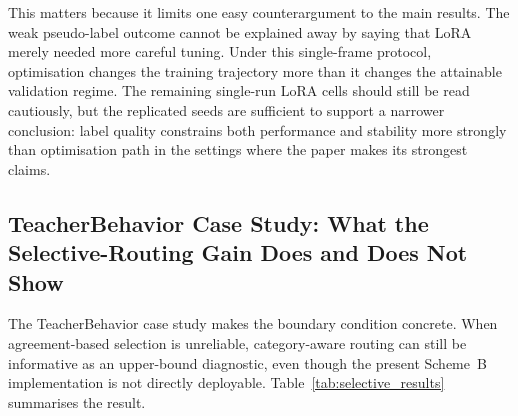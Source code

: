 \documentclass{ieeeaccess}
\providecommand{\DIFdelbegin}{} %
\providecommand{\DIFaddbeginFL}{} %
\providecommand{\DIFaddendFL}{} %
\providecommand{\DIFdelendFL}{} %
\newcommand{\DIFscaledelfig}{0.5}
\newlength{\DIFdelgraphicswidth} %
\newlength{\DIFdelgraphicsheight} %
\newcommand{\DIFaddincludegraphics}[2][]{{\color{blue}\fbox{\DIFOincludegraphics[#1]{#2}}}} %
\newcommand{\DIFdelincludegraphics}[2][]{%
\sbox{\DIFdelgraphicsbox}{\DIFOincludegraphics[#1]{#2}}%
\settoboxwidth{\DIFdelgraphicswidth}{\DIFdelgraphicsbox} %
\settoboxtotalheight{\DIFdelgraphicsheight}{\DIFdelgraphicsbox} %
\scalebox{\DIFscaledelfig}{%
\parbox[b]{\DIFdelgraphicswidth}{\usebox{\DIFdelgraphicsbox}\\[-\baselineskip] \rule{\DIFdelgraphicswidth}{0em}}\llap{\resizebox{\DIFdelgraphicswidth}{\DIFdelgraphicsheight}{%
\setlength{\unitlength}{\DIFdelgraphicswidth}%
\begin{picture}(1,1)%
\thicklines\linethickness{2pt} %
{\color[rgb]{1,0,0}\put(0,0){\framebox(1,1){}}}%
{\color[rgb]{1,0,0}\put(0,0){\line( 1,1){1}}}%
{\color[rgb]{1,0,0}\put(0,1){\line(1,-1){1}}}%
\end{picture}%
}\hspace*{3pt}}} %
} %
\DeclareRobustCommand{\DIFdelbegin}{\DIFOdelbegin \let\includegraphics\DIFdelincludegraphics} %
\DeclareRobustCommand{\DIFaddbeginFL}{\DIFOaddbeginFL \let\includegraphics\DIFaddincludegraphics} %
\DeclareRobustCommand{\DIFaddendFL}{\DIFOaddendFL \let\includegraphics\DIFOincludegraphics} %
\DeclareRobustCommand{\DIFdelendFL}{\DIFOaddendFL \let\includegraphics\DIFOincludegraphics} %
\begin{document}
This matters because it limits one easy counterargument to the main
results.
The weak pseudo-label outcome cannot be explained away by saying that
LoRA merely needed more careful tuning.
Under this single-frame protocol, optimisation changes the
training trajectory more than it changes the attainable validation
regime.
The remaining single-run LoRA cells should still be read cautiously,
but the replicated seeds are sufficient to support a narrower
conclusion: label quality constrains both performance and stability
more strongly than optimisation path in the settings where the paper
makes its strongest claims.

\subsection{TeacherBehavior Case Study: What the Selective-Routing
Gain Does and Does Not Show}

The TeacherBehavior case study makes the boundary condition concrete.
When agreement-based selection is unreliable, category-aware routing
can still be informative as an upper-bound diagnostic, even though the
present Scheme~B implementation is not directly deployable.
Table~\ref{tab:selective_results} summarises the result.

\DIFdelbegin %
\DIFdelendFL \DIFaddbeginFL \begin{table}[!ht]
\DIFaddendFL \caption{Comparison of annotation strategies on TeacherBehavior
(validation accuracy, \%). The selective strategy uses pseudo-labels
for high-anchor classes and zero-shot CLIP for low-anchor classes.
High-anchor: blackboard-writing, teacher, screen, blackboard.
Low-anchor: guide, answer, on-stage interaction, stand.
The zero-shot baseline in this table uses the prompt-ensemble setting.
\textbf{Selective routing uses ground-truth category as oracle routing
variable at evaluation time and represents a diagnostic upper bound,
not a deployable pipeline or a deployable-method comparison.}}
\label{tab:selective_results}
\centering
{}
\end{table}
\end{document}
